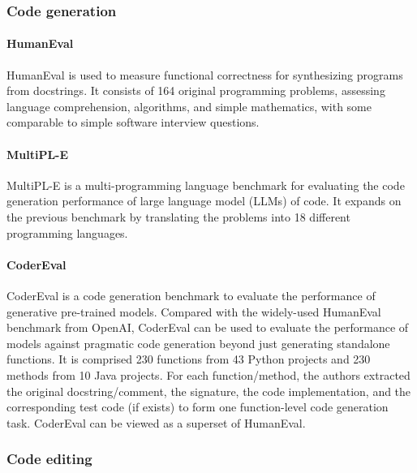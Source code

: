 \subsubsection{Code generation}

\paragraph{HumanEval \cite{chen2021}}
HumanEval is used to measure functional correctness for synthesizing programs from
docstrings. It consists of 164 original programming problems, assessing
language comprehension, algorithms, and simple mathematics, with some
comparable to simple software interview questions.

\paragraph{MultiPL-E \cite{cassano2022}}
MultiPL-E is a multi-programming language benchmark for evaluating the code
generation performance of large language model (LLMs) of code. It expands on
the previous benchmark by translating the problems into 18 different
programming languages.

\paragraph{CoderEval \cite{Zhang_2024}}
CoderEval is a code generation benchmark to evaluate the performance
of generative pre-trained models. Compared with the widely-used HumanEval
benchmark from OpenAI, CoderEval can be used to evaluate the performance of
models against pragmatic code generation beyond just generating standalone
functions. It is comprised 230 functions from 43 Python projects and 230 methods
from 10 Java projects. For each function/method, the authors extracted the original
docstring/comment, the signature, the code implementation, and the corresponding
test code (if exists) to form one function-level code generation task. CoderEval
can be viewed as a superset of HumanEval.

\subsubsection{Code editing}

